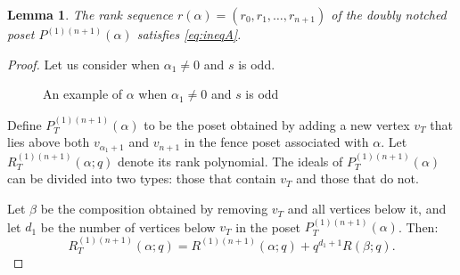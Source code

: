 \documentclass{article}
\newtheorem{lemma}{Lemma}
\theoremstyle{remark}
\begin{document}
\begin{lemma}\label{lem:doublyeqa}
    The rank sequence \( r(\alpha) = (r_{0}, r_{1}, \ldots, r_{n+1}) \) of the doubly notched poset $P^{(1)(n+1)}(\alpha)$ satisfies \eqref{eq:ineqA}.
\end{lemma}
\begin{proof}
    Let us consider when $\alpha_1\neq 0$ and $s$ is odd.

\begin{figure}[H]
    \centering
    \caption{An example of $\alpha$ when $\alpha_1\neq 0$ and $s$ is odd}
    \label{fig:alphaexdoubly}
\end{figure}

Define \( P_T^{(1)(n+1)}(\alpha) \) to be the poset obtained by adding a new vertex \( v_T \) that lies above both \( v_{\alpha_1 + 1} \) and \( v_{n+1} \) in the fence poset associated with \( \alpha \). Let \( R_T^{(1)(n+1)}(\alpha; q) \) denote its rank polynomial. The ideals of \( P_T^{(1)(n+1)}(\alpha) \) can be divided into two types: those that contain \( v_T \) and those that do not.

Let \( \beta \) be the composition obtained by removing \( v_T \) and all vertices below it, and let \( d_1 \) be the number of vertices below \( v_T \) in the poset \( P_T^{(1)(n+1)}(\alpha) \). Then:
\[
R_T^{(1)(n+1)}(\alpha; q) = R^{(1)(n+1)}(\alpha; q) + q^{d_1 + 1} R(\beta; q).
\]


\end{proof}
\end{document}
